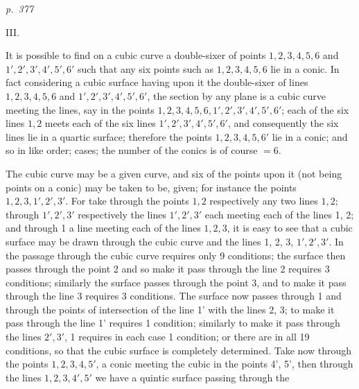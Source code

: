\documentclass[11pt,a4paper]{book}
\begin{document}
\clearpage


\bigskip
\textit{p.~377}
\smallskip

\noindent
\textsc{III.}

It is possible to find on a cubic curve a double-sixer of points $1, 2, 3, 4, 5, 6$
and $1', 2', 3', 4', 5', 6'$ such that any six points such as $1, 2, 3, 4, 5, 6$ lie in a
conic.  In fact considering a cubic surface having upon it the double-sixer of lines
$1, 2, 3, 4, 5, 6$ and $1', 2', 3', 4', 5', 6'$, the section by any plane is a cubic curve
meeting the lines, say in the points $1, 2, 3, 4, 5, 6, 1', 2', 3', 4', 5', 6'$; each of the
six lines $1, 2$ meets each of the six lines $1', 2', 3', 4', 5', 6'$, and consequently the six
lines lie in a quartic surface; therefore the points $1, 2, 3, 4, 5, 6'$ lie in a conic; and so in like
order; cases; the number of the conics is of course $= 6$.

The cubic curve may be a given curve, and six of the points upon it (not being
points on a conic) may be taken to be, given; for instance the points $1, 2, 3, 1', 2', 3'$.
For take through the points $1, 2$ respectively any two lines $1, 2$; through $1', 2', 3'$
respectively the lines $1', 2', 3'$ each meeting each of the lines 1, 2; and through 1
a line meeting each of the lines $1, 2, 3$, it is easy to see that a cubic surface may
be drawn through the cubic curve and the lines 1, 2, 3, $1', 2', 3'$.  In the passage
through the cubic curve requires only 9 conditions; the surface then passes through the point
2 and so make it pass through the line 2 requires 3 conditions; similarly the surface
passes through the point 3, and to make it pass through the line 3 requires 3 conditions.
The surface now passes through 1 and through the points of intersection of the
line 1' with the lines 2, 3; to make it pass through the line 1' requires 1 condition;
similarly to make it pass through the lines $2', 3'$, 1 requires in each case 1 condition;
or there are in all 19 conditions, so that the cubic surface is completely determined.
Take now through the points $1, 2, 3, 4, 5'$, a conic meeting the cubic in the points 4',
5', then through the lines $1, 2, 3, 4', 5'$ we have a quintic surface passing through the

\clearpage
\end{document}
